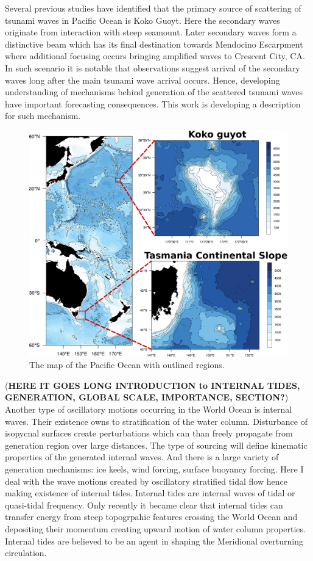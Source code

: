 Several previous studies have identified that the primary source of scattering of tsunami waves in Pacific Ocean is Koko Guoyt. Here the secondary waves originate from interaction with steep seamount. Later secondary waves form a distinctive beam which has its final destination towards Mendocino Escarpment where additional focusing occurs bringing amplified waves to Crescent City, CA. In such scenario it is notable that observations suggest arrival of the secondary waves long after the main tsunami wave arrival occurs. Hence, developing understanding of mechanisms behind generation of the scattered tsunami waves have important forecasting consequences. This work is developing a description for such mechanism.\\

\begin{figure}
\includegraphics[scale=0.5]{../figures/map_w_places.pdf}
\caption{The map of the Pacific Ocean with outlined regions.}
\end{figure}
(\textbf{HERE IT GOES LONG INTRODUCTION to INTERNAL TIDES, GENERATION, GLOBAL SCALE, IMPORTANCE, SECTION?})\\
Another type of oscillatory motions occurring in the World Ocean is internal waves. Their existence owns to stratification of the water column. Disturbance of isopycnal surfaces create perturbations which can than freely propagate from generation region over large distances. The type of sourcing will define kinematic properties of the generated internal waves. And there is a large variety of generation mechanisms: ice keels, wind forcing, surface buoyancy forcing. Here I deal with the wave motions created by oscillatory stratified tidal flow hence making existence of internal tides. Internal tides are internal waves of tidal or quasi-tidal frequency. Only recently it became clear that internal tides can transfer energy from steep topogrpahic features crossing the World Ocean and depositing their momentum creating upward motion of water column properties. Internal tides are believed to be an agent in shaping the Meridional overturning circulation.\\
